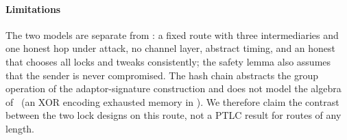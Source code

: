 \paragraph{Limitations}
The two models are separate from : a fixed route with three
intermediaries and one honest hop under attack, no channel layer, abstract timing, and an honest
 that chooses all locks and tweaks consistently; the safety lemma also
assumes that the sender is never compromised. The hash chain abstracts the group operation of
the adaptor-signature construction and does not model the algebra of~\cite{malavolta2019} (an
XOR encoding exhausted memory in \tamarin). We therefore claim the contrast between the two lock
designs on this route, not a PTLC result for routes of any length.
